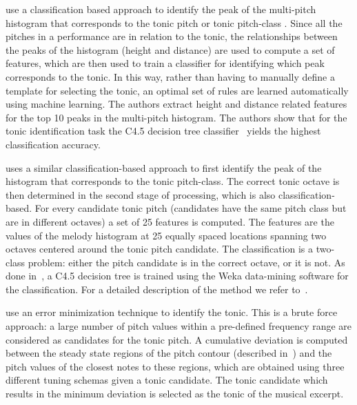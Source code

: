 {\cite{salamon2012multipitch,gulati2012two} use a classification based approach to identify the peak of the multi-pitch histogram that corresponds to the tonic pitch \cite{salamon2012multipitch} or tonic pitch-class \cite{gulati2012two}. Since all the pitches in a performance are in relation to the tonic, the relationships between the peaks of the histogram (height and distance) are used to compute a set of features, which are then used to train a classifier for identifying which peak corresponds to the tonic. In this way, rather than having to manually define a template for selecting the tonic, an optimal set of rules are learned automatically using machine learning. The authors extract height and distance related features for the top 10 peaks in the multi-pitch histogram. The authors show that for the tonic identification task the C4.5 decision tree classifier~\cite{Quinlan:1993:CPM:152181} yields the highest classification accuracy. 

\cite{SGulatiIstanbul2012} uses a similar classification-based approach to first identify the peak of the histogram that corresponds to the tonic pitch-class. The correct tonic octave is then determined in the second stage of processing, which is also classification-based. For every candidate tonic pitch (candidates have the same pitch class but are in
different octaves) a set of 25 features is computed. The features are the values of the melody histogram at 25 equally spaced locations spanning two octaves centered around the tonic pitch candidate. The classification is a two-class problem: either the pitch candidate is in the correct octave, or it is not. As done in~\cite{salamon2012multipitch}, a C4.5 decision tree is trained using the Weka data-mining software for the classification. For a detailed description of the method we refer to~\cite{SGulati_MThesis2012}.

\cite{Sengupta2005b} use an error minimization technique to identify the tonic. This is a brute force approach: a large number of pitch values within a pre-defined frequency range are considered as candidates for the tonic pitch. A cumulative deviation is computed between the steady state regions of the pitch contour (described in~) and the pitch values of the closest notes to these regions, which are obtained using three different tuning schemas given a tonic candidate. The tonic candidate which results in the minimum deviation is selected as the tonic of the musical excerpt.

}
